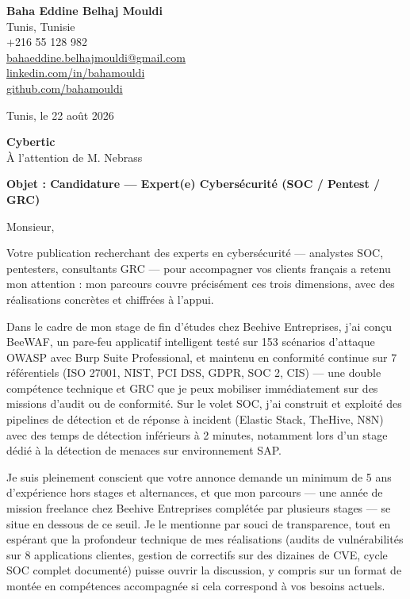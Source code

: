 \documentclass[a4paper,11pt]{article}
\begin{document}
\begin{flushright}
{\bfseries Baha Eddine Belhaj Mouldi}\\
Tunis, Tunisie\\
+216 55 128 982\\
\href{mailto:bahaeddine.belhajmouldi@gmail.com}{bahaeddine.belhajmouldi@gmail.com}\\
\href{https://linkedin.com/in/bahamouldi}{linkedin.com/in/bahamouldi}\\
\href{https://github.com/bahamouldi}{github.com/bahamouldi}
\end{flushright}

\vspace{0.8cm}

\begin{flushleft}
Tunis, le 22 août 2026

\vspace{0.8cm}

{\bfseries Cybertic}\\
À l'attention de M. Nebrass

\vspace{0.6cm}

{\bfseries Objet : Candidature --- Expert(e) Cybersécurité (SOC / Pentest / GRC)}
\end{flushleft}

\vspace{0.6cm}

Monsieur,

Votre publication recherchant des experts en cybersécurité --- analystes SOC, pentesters, consultants GRC --- pour accompagner vos clients français a retenu mon attention : mon parcours couvre précisément ces trois dimensions, avec des réalisations concrètes et chiffrées à l'appui.

Dans le cadre de mon stage de fin d'études chez Beehive Entreprises, j'ai conçu BeeWAF, un pare-feu applicatif intelligent testé sur 153 scénarios d'attaque OWASP avec Burp Suite Professional, et maintenu en conformité continue sur 7 référentiels (ISO 27001, NIST, PCI DSS, GDPR, SOC 2, CIS) --- une double compétence technique et GRC que je peux mobiliser immédiatement sur des missions d'audit ou de conformité. Sur le volet SOC, j'ai construit et exploité des pipelines de détection et de réponse à incident (Elastic Stack, TheHive, N8N) avec des temps de détection inférieurs à 2 minutes, notamment lors d'un stage dédié à la détection de menaces sur environnement SAP.

Je suis pleinement conscient que votre annonce demande un minimum de 5 ans d'expérience hors stages et alternances, et que mon parcours --- une année de mission freelance chez Beehive Entreprises complétée par plusieurs stages --- se situe en dessous de ce seuil. Je le mentionne par souci de transparence, tout en espérant que la profondeur technique de mes réalisations (audits de vulnérabilités sur 8 applications clientes, gestion de correctifs sur des dizaines de CVE, cycle SOC complet documenté) puisse ouvrir la discussion, y compris sur un format de montée en compétences accompagnée si cela correspond à vos besoins actuels.
\end{document}
